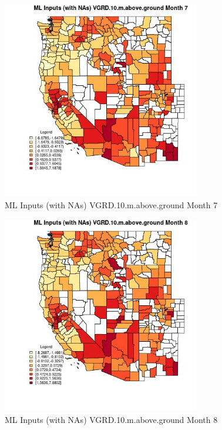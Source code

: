 \begin{figure} 
\centering  
\includegraphics[width=0.77\textwidth]{Code_Outputs/Report_ML_input_PM25_Step4_part_e_de_duplicated_aves_compiled_2019-05-21wNAs_CountyVGRD10mabovegroundmedianMonth7.jpg} 
\caption{\label{fig:Report_ML_input_PM25_Step4_part_e_de_duplicated_aves_compiled_2019-05-21wNAsCountyVGRD10mabovegroundmedianMonth7}ML Inputs (with NAs) VGRD.10.m.above.ground Month 7} 
\end{figure} 
 

\begin{figure} 
\centering  
\includegraphics[width=0.77\textwidth]{Code_Outputs/Report_ML_input_PM25_Step4_part_e_de_duplicated_aves_compiled_2019-05-21wNAs_CountyVGRD10mabovegroundmedianMonth8.jpg} 
\caption{\label{fig:Report_ML_input_PM25_Step4_part_e_de_duplicated_aves_compiled_2019-05-21wNAsCountyVGRD10mabovegroundmedianMonth8}ML Inputs (with NAs) VGRD.10.m.above.ground Month 8} 
\end{figure} 
 

